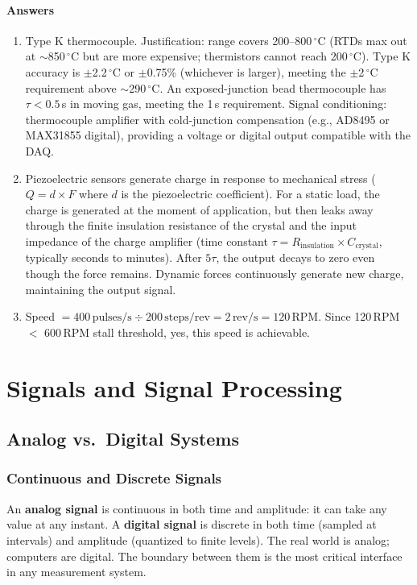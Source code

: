 \documentclass[11pt,letterpaper,twoside,openany]{book}
\newcommand{\degC}{\ensuremath{{}^{\circ}\text{C}}}
\begin{document}
\subsection{Answers}
\begin{enumerate}[leftmargin=1.5em]
\item Type K thermocouple. Justification: range covers 200--800\,\degC{} (RTDs max out at $\sim$850\,\degC{} but are more expensive; thermistors cannot reach 200\,\degC{}). Type K accuracy is $\pm$2.2\,\degC{} or $\pm$0.75\% (whichever is larger), meeting the $\pm$2\,\degC{} requirement above $\sim$290\,\degC{}. An exposed-junction bead thermocouple has $\tau < 0.5$\,s in moving gas, meeting the 1\,s requirement. Signal conditioning: thermocouple amplifier with cold-junction compensation (e.g., AD8495 or MAX31855 digital), providing a voltage or digital output compatible with the DAQ.
\item Piezoelectric sensors generate charge in response to mechanical stress ($Q = d \times F$ where $d$ is the piezoelectric coefficient). For a static load, the charge is generated at the moment of application, but then leaks away through the finite insulation resistance of the crystal and the input impedance of the charge amplifier (time constant $\tau = R_{\text{insulation}} \times C_{\text{crystal}}$, typically seconds to minutes). After $5\tau$, the output decays to zero even though the force remains. Dynamic forces continuously generate new charge, maintaining the output signal.
\item Speed $= 400\,\text{pulses/s} \div 200\,\text{steps/rev} = 2\,\text{rev/s} = 120\,\text{RPM}$. Since 120\,RPM $<$ 600\,RPM stall threshold, yes, this speed is achievable.
\end{enumerate}


\part{Signals and Signal Processing}

\chapter{Analog vs.\ Digital Systems}

\section{Continuous and Discrete Signals}
An \textbf{analog signal} is continuous in both time and amplitude: it can take any value at any instant. A \textbf{digital signal} is discrete in both time (sampled at intervals) and amplitude (quantized to finite levels). The real world is analog; computers are digital. The boundary between them is the most critical interface in any measurement system.
\end{document}
